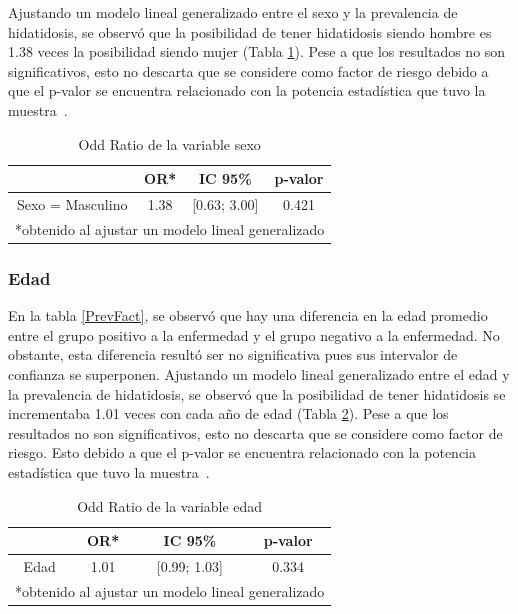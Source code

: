 \newpage

Ajustando un modelo lineal generalizado entre el sexo y la prevalencia de hidatidosis, se observó que la posibilidad de tener hidatidosis siendo hombre es 1.38 veces la posibilidad siendo mujer (Tabla \ref{or_sexo}). Pese a que los resultados no son significativos, esto no descarta que se considere como factor de riesgo debido a que el p-valor se encuentra relacionado con la potencia estadística que tuvo la muestra~\cite{ellis2010essential}.


\begin{table}[h]
	\centering
	\caption{Odd Ratio de la variable sexo}
	\label{or_sexo}
	\begin{tabular}{lccc}
		\hline
		& OR*   & IC 95\%           & p-valor \\ \hline
		\multicolumn{1}{c}{Sexo = Masculino}  & 1.38  & [0.63; 3.00] & 0.421   \\ \hline
		\multicolumn{4}{l}{*obtenido al ajustar un modelo lineal generalizado}
	\end{tabular}
\end{table}

\subsubsection{Edad}
En la tabla \ref{PrevFact}, se observó que hay una diferencia en la edad promedio entre el grupo positivo a la enfermedad y el grupo negativo a la enfermedad. No obstante, esta diferencia resultó ser no significativa pues sus intervalor de confianza se superponen. Ajustando un modelo lineal generalizado entre el edad y la prevalencia de hidatidosis, se observó que la posibilidad de tener hidatidosis se incrementaba 1.01 veces con cada año de edad (Tabla \ref{or_edad}). Pese a que los resultados no son significativos, esto no descarta que se considere como factor de riesgo. Esto debido a que el p-valor se encuentra relacionado con la potencia estadística que tuvo la muestra~\cite{ellis2010essential}.

\begin{table}[h]
	\centering
	\caption{Odd Ratio de la variable edad}
	\label{or_edad}
	\begin{tabular}{lccc}
		\hline
		& OR*   & IC 95\%          & p-valor \\ \hline
		\multicolumn{1}{c}{Edad}  & 1.01  & [0.99; 1.03] & 0.334   \\ \hline
		\multicolumn{4}{l}{*obtenido al ajustar un modelo lineal generalizado}
	\end{tabular}
\end{table}

